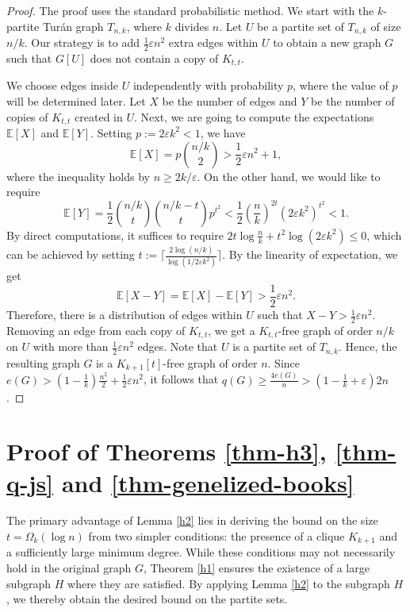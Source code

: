 \documentclass[11pt,a4paper]{article}
\theoremstyle{plain}
\theoremstyle{definition}
\begin{document}
\begin{proof} 
The proof uses the standard probabilistic method.  
We start with the $k$-partite Tur\'{a}n graph 
$T_{n,k}$, where $k$ divides $n$. 
Let $U$ be a partite set of $T_{n,k}$ of size $n/k$.  
Our strategy is to add $\frac{1}{2}\varepsilon n^2$ extra edges within $U$ to obtain a new graph $G$ such that $G[U]$ does not contain a copy of $K_{t,t}$. 

We choose edges inside $U$ independently with probability $p$, where the value of $p$ will be determined later. 
Let $X$ be the number of edges and 
$Y$ be the number of copies of $K_{t,t}$ created in $U$.  
Next, we are going to compute the expectations  $\mathbb{E}[X]$ and 
$\mathbb{E}[Y]$.  
Setting $p:=2\varepsilon k^2 <1$, we have 
\[   \mathbb{E}[X] = p {n/k \choose 2} >  \frac{1}{2}\varepsilon n^2 + 1, \] 
where the inequality holds by $n\ge 2k/ \varepsilon$. 
On the other hand, we would like to require  
\[  \mathbb{E}[Y] = \frac{1}{2} {n/k \choose t} {n/k -t \choose t} p^{t^2} 
< \frac{1}{2}\left(\frac{n}{k} \right)^{2t} (2\varepsilon k^2)^{t^2} < 1. \]
By direct computations, it suffices to require $2t \log \frac{n}{k} + 
t^2 \log (2 \varepsilon k^2) \le 0$, which can be achieved by 
setting $t:= \big\lceil\frac{2\log ({n}/{k})}{ \log ({1}/{2\varepsilon k^2})}\big\rceil$. 
By the linearity of expectation, 
we get 
\[ \mathbb{E}[X-Y]  =\mathbb{E}[X]-\mathbb{E}[Y] 
 > \frac{1}{2}\varepsilon n^2 . \]   
 Therefore, there is a distribution of edges within $U$ such that $X-Y> \frac{1}{2}\varepsilon n^2$. 
 Removing an edge from each copy of $K_{t,t}$, we get a $K_{t,t}$-free graph of order $n/k$ on $U$ with more than $\frac{1}{2}\varepsilon n^2$ edges. 
 Note that $U$ is a partite set of $T_{n,k}$. 
Hence, the resulting graph $G$ is a $K_{k+1}[t]$-free graph of order $n$. 
Since $e(G) > (1- \frac{1}{k}) \frac{n^2}{2} + \frac{1}{2}\varepsilon n^2$, 
it follows that $q(G)\ge \frac{4e(G)}{n} > (1-\frac{1}{k} + \varepsilon )2n $. 
\end{proof}




\section{Proof of Theorems \ref{thm-h3}, \ref{thm-q-js} and \ref{thm-genelized-books}}

\label{sec-5}



The primary advantage of Lemma \ref{h2} lies in deriving the bound on the size $t=\Omega_k(\log n)$ from two simpler conditions: the presence of a clique $K_{k+1}$ and a sufficiently large minimum degree. While these conditions may not necessarily hold in the original graph $G$, Theorem \ref{h1} ensures the existence of a large subgraph $H$ where they are satisfied. By applying Lemma \ref{h2} to the subgraph $H$, we thereby obtain the desired bound on the partite sets. 
\end{document}
